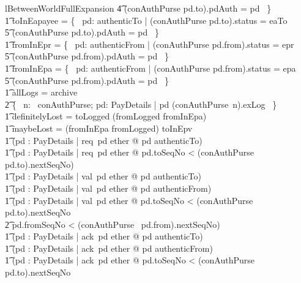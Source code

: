\begin{LNewLemma}
\begin{zeves-theorem}{lBetweenWorldFullExpansion}
                    \t4 \land (conAuthPurse pd.to).pdAuth = pd ~\} \land \\ \t1
            toInEapayee = \{~ pd: authenticTo | (conAuthPurse pd.to).status = eaTo \\
                    \t5 \land (conAuthPurse pd.to).pdAuth = pd ~\} \land \\ \t1
            fromInEpr = \{~ pd: authenticFrom | (conAuthPurse pd.from).status = epr \\
                    \t5 \land (conAuthPurse pd.from).pdAuth = pd ~\} \land \\ \t1
            fromInEpa = \{~ pd: authenticFrom | (conAuthPurse pd.from).status = epa \\
                    \t5 \land (conAuthPurse pd.from).pdAuth = pd ~\} \land \\ \t1
            allLogs = archive \cup \\
                \t2 \{~ n: \dom~conAuthPurse; pd: PayDetails | pd \in (conAuthPurse~n).exLog ~\} \land \\ \t1
            definitelyLost = toLogged \cap (fromLogged \cup fromInEpa) \land \\ \t1
            maybeLost = (fromInEpa \cup fromLogged) \cap toInEpv \land \\
    \t1
            (\forall pd : PayDetails | req~pd \in ether @ pd \in authenticTo)
            \land \\ \t1
            (\forall pd : PayDetails | req~pd \in ether @
                 pd.toSeqNo < (conAuthPurse~ pd.to).nextSeqNo) \\ \t1
            \land
            (\forall pd : PayDetails | val~pd \in ether @ pd \in authenticTo) \land \\ \t1
            (\forall pd : PayDetails | val~pd \in ether @ pd \in authenticFrom) \land \\ \t1
            (\forall pd : PayDetails | val~pd \in ether @ pd.toSeqNo < (conAuthPurse~ pd.to).nextSeqNo \\
                \t2 \land pd.fromSeqNo < (conAuthPurse~ pd.from).nextSeqNo) \land \\ \t1
            (\forall pd : PayDetails | ack~pd \in ether @ pd \in authenticTo)\land  \\ \t1
            (\forall pd : PayDetails | ack~pd \in ether @ pd \in authenticFrom) \land \\ \t1
            (\forall pd : PayDetails | ack~pd \in ether @ pd.toSeqNo < (conAuthPurse~ pd.to).nextSeqNo  \\ %

\end{zeves-theorem}
\end{LNewLemma}
